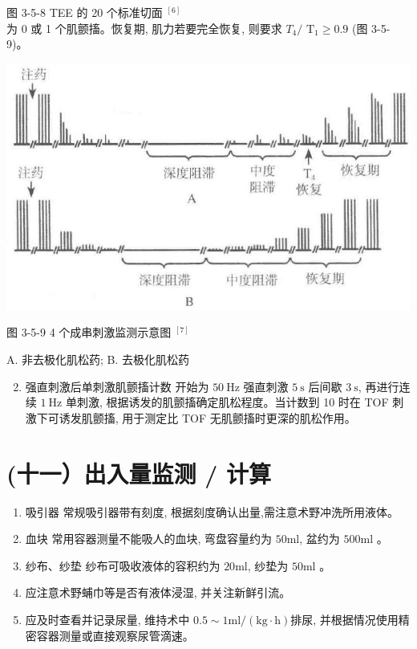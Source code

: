 \documentclass[10pt]{article}
\begin{document}
图 3-5-8 TEE 的 20 个标准切面 ${ }^{[6]}$\\
为 0 或 1 个肌颤搐。恢复期, 肌力若要完全恢复, 则要求 $T_{4} /$ $\mathrm{T}_{1} \geqslant 0.9$ (图 3-5-9)。

\begin{center}
\includegraphics[max width=\textwidth]{2024_07_05_645bb794a4d4f32ee0c8g-107}
\end{center}

图 3-5-9 4 个成串刺激监测示意图 ${ }^{[7]}$

A. 非去极化肌松药; B. 去极化肌松药

\begin{enumerate}
  \setcounter{enumi}{1}
  \item 强直刺激后单刺激肌颤搐计数 开始为 $50 \mathrm{~Hz}$ 强直刺激 $5 \mathrm{~s}$ 后间歇 $3 \mathrm{~s}$, 再进行连续 $1 \mathrm{~Hz}$ 单刺激, 根据诱发的肌颤搐确定肌松程度。当计数到 10 时在 TOF 刺激下可诱发肌颤搐, 用于测定比 TOF 无肌颤搐时更深的肌松作用。
\end{enumerate}

\section*{(十一）出入量监测 / 计算}
\begin{enumerate}
  \item 吸引器 常规吸引器带有刻度, 根据刻度确认出量,需注意术野冲洗所用液体。

  \item 血块 常用容器测量不能吸人的血块, 弯盘容量约为 $50 \mathrm{ml}$, 盆约为 $500 \mathrm{ml}$ 。

  \item 纱布、纱垫 纱布可吸收液体的容积约为 $20 \mathrm{ml}$, 纱垫为 $50 \mathrm{ml}$ 。

  \item 应注意术野蜅巾等是否有液体浸湿, 并关注新鲜引流。

  \item 应及时查看并记录尿量, 维持术中 $0.5 \sim 1 \mathrm{ml} /(\mathrm{kg} \cdot \mathrm{h})$排尿, 并根据情况使用精密容器测量或直接观察尿管滴速。

\end{enumerate}
\end{document}
